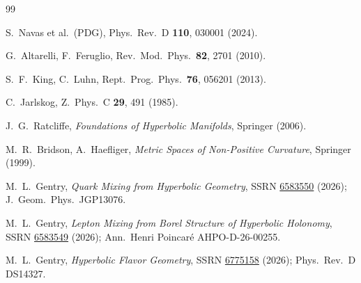 \documentclass[11pt,a4paper]{article}
\begin{document}
\begin{thebibliography}{99}

S.~Navas et al.\ (PDG),
Phys.\ Rev.\ D \textbf{110}, 030001 (2024).

G.~Altarelli, F.~Feruglio,
Rev.\ Mod.\ Phys.\ \textbf{82}, 2701 (2010).

S.~F.~King, C.~Luhn,
Rept.\ Prog.\ Phys.\ \textbf{76}, 056201 (2013).

C.~Jarlskog,
Z.\ Phys.\ C \textbf{29}, 491 (1985).

J.~G.~Ratcliffe,
\textit{Foundations of Hyperbolic Manifolds}, Springer (2006).

M.~R.~Bridson, A.~Haefliger,
\textit{Metric Spaces of Non-Positive Curvature}, Springer (1999).

M.~L.~Gentry,
\textit{Quark Mixing from Hyperbolic Geometry},
SSRN \href{https://doi.org/10.2139/ssrn.6583550}{6583550} (2026);
J.\ Geom.\ Phys.\ JGP13076.

M.~L.~Gentry,
\textit{Lepton Mixing from Borel Structure of Hyperbolic Holonomy},
SSRN \href{https://doi.org/10.2139/ssrn.6583549}{6583549} (2026);
Ann.\ Henri Poincar\'e AHPO-D-26-00255.

M.~L.~Gentry,
\textit{Hyperbolic Flavor Geometry},
SSRN \href{https://doi.org/10.2139/ssrn.6775158}{6775158} (2026);
Phys.\ Rev.\ D DS14327.

\end{thebibliography}
\end{document}
